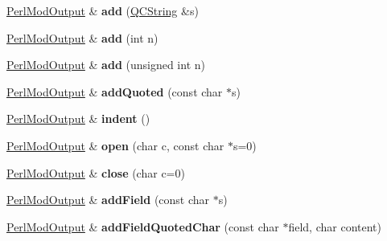 \begin{DoxyCompactItemize}
\mbox{\label{class_perl_mod_output_a1751b1bc64d228181dc903bfb91a4f84}} 
\mbox{\hyperlink{class_perl_mod_output}{Perl\+Mod\+Output}} \& {\bfseries add} (\mbox{\hyperlink{class_q_c_string}{Q\+C\+String}} \&s)
\item 
\mbox{\label{class_perl_mod_output_a0517f1dc18d5d9c8c1d4e2d2aee24479}} 
\mbox{\hyperlink{class_perl_mod_output}{Perl\+Mod\+Output}} \& {\bfseries add} (int n)
\item 
\mbox{\label{class_perl_mod_output_af4e7a0431dc492c404654d09edf519f3}} 
\mbox{\hyperlink{class_perl_mod_output}{Perl\+Mod\+Output}} \& {\bfseries add} (unsigned int n)
\item 
\mbox{\label{class_perl_mod_output_ad17287468f089f08464b350ba2a140b8}} 
\mbox{\hyperlink{class_perl_mod_output}{Perl\+Mod\+Output}} \& {\bfseries add\+Quoted} (const char $\ast$s)
\item 
\mbox{\label{class_perl_mod_output_ac08110cde760efc8995f58e5a922ffff}} 
\mbox{\hyperlink{class_perl_mod_output}{Perl\+Mod\+Output}} \& {\bfseries indent} ()
\item 
\mbox{\label{class_perl_mod_output_a1a2f0463cf38f334085541eb1b4211fa}} 
\mbox{\hyperlink{class_perl_mod_output}{Perl\+Mod\+Output}} \& {\bfseries open} (char c, const char $\ast$s=0)
\item 
\mbox{\label{class_perl_mod_output_a70c627c62f8699e4b184515e1c18b2ee}} 
\mbox{\hyperlink{class_perl_mod_output}{Perl\+Mod\+Output}} \& {\bfseries close} (char c=0)
\item 
\mbox{\label{class_perl_mod_output_a6dbf1c36ff3ce95fed4a2ff3c9743149}} 
\mbox{\hyperlink{class_perl_mod_output}{Perl\+Mod\+Output}} \& {\bfseries add\+Field} (const char $\ast$s)
\item 
\mbox{\label{class_perl_mod_output_a41c914573da8e0303a9b16ee74f5e3ed}} 
\mbox{\hyperlink{class_perl_mod_output}{Perl\+Mod\+Output}} \& {\bfseries add\+Field\+Quoted\+Char} (const char $\ast$field, char content)

\end{DoxyCompactItemize}
